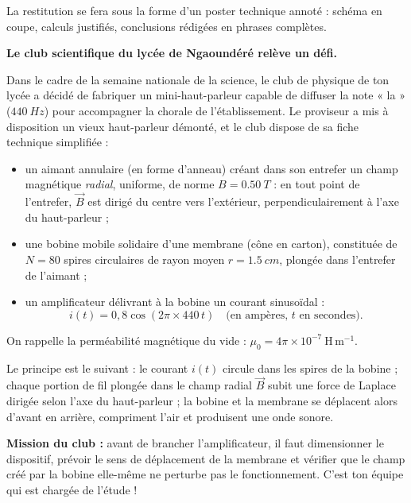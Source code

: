 \documentclass[11pt]{article}
\newcommand{\cle}[1]{{\popxbold\color{popdark}#1}}
\newcounter{popsec}
\newcounter{popsub}
\newcommand{\courssub}[1]{%
  \stepcounter{popsub}%
  \par\vspace{9pt}\noindent{\popxbold\fontsize{11.5}{13}\selectfont\color{popink}{\color{poporange}\thepopsec.\thepopsub}\hspace{6pt}#1}\par\nopagebreak\vspace{4pt}
}
\begin{document}
La restitution se fera sous la forme d'un \cle{poster technique annoté} : schéma en coupe, calculs justifiés, conclusions rédigées en phrases complètes.

\courssub{Situation}

\textbf{Le club scientifique du lycée de Ngaoundéré relève un défi.}

Dans le cadre de la semaine nationale de la science, le club de physique de ton lycée a décidé de fabriquer un mini-haut-parleur capable de diffuser la note « la » ($\SI{440}{Hz}$) pour accompagner la chorale de l'établissement. Le proviseur a mis à disposition un vieux haut-parleur démonté, et le club dispose de sa fiche technique simplifiée :

\begin{itemize}
\item un \cle{aimant annulaire} (en forme d'anneau) créant dans son entrefer un champ magnétique \emph{radial}, uniforme, de norme $B = \SI{0,50}{T}$ : en tout point de l'entrefer, $\vec{B}$ est dirigé du centre vers l'extérieur, perpendiculairement à l'axe du haut-parleur ;
\item une \cle{bobine mobile} solidaire d'une membrane (cône en carton), constituée de $N = 80$ spires circulaires de rayon moyen $r = \SI{1,5}{cm}$, plongée dans l'entrefer de l'aimant ;
\item un amplificateur délivrant à la bobine un courant sinusoïdal :
\[ i(t) = 0{,}8 \cos(2\pi \times 440\, t) \quad \text{(en ampères, $t$ en secondes)}. \]
\end{itemize}

On rappelle la perméabilité magnétique du vide : $\mu_0 = 4\pi \times 10^{-7}\ \mathrm{H\,m^{-1}}$.

Le principe est le suivant : le courant $i(t)$ circule dans les spires de la bobine ; chaque portion de fil plongée dans le champ radial $\vec{B}$ subit une force de Laplace dirigée selon l'axe du haut-parleur ; la bobine et la membrane se déplacent alors d'avant en arrière, compriment l'air et produisent une onde sonore.

\textbf{Mission du club :} avant de brancher l'amplificateur, il faut dimensionner le dispositif, prévoir le sens de déplacement de la membrane et vérifier que le champ créé par la bobine elle-même ne perturbe pas le fonctionnement. C'est ton équipe qui est chargée de l'étude !

\courssub{Consignes}
\end{document}
